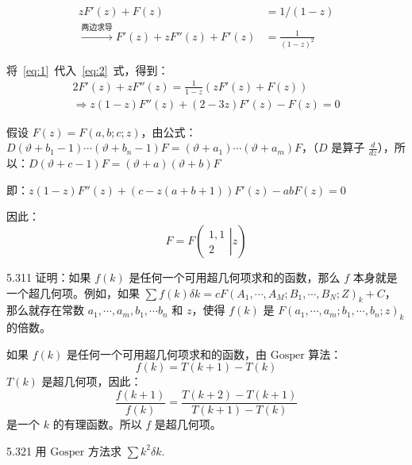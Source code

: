 \begin{align}
  zF'(z) + F(z) &= 1 / (1-z) \tag{1} \label{eq:1} \\
  \xrightarrow{\text{两边求导}} F'(z) + z F''(z) + F'(z) &= \frac{1}{(1-z)^2} \tag{2} \label{eq:2}
\end{align}

将~\ref{eq:1}~代入~\ref{eq:2}~式，得到：
\begin{gather*}
  2 F'(z) + z F''(z) = \frac{1}{1-z} (zF'(z) + F(z)) \\
  \Rightarrow z(1-z) F''(z) + (2 - 3z) F'(z) - F(z) = 0
\end{gather*}

假设 \( F(z) = F(a,b;c;z) \)，由公式：\( D(\vartheta + b_1 - 1) \cdots (\vartheta + b_n -1) F = (\vartheta + a_1) \cdots (\vartheta + a_m) F \)，（\( D \) 是算子 \( \frac{d}{dz} \)），所以：\( D(\vartheta + c - 1) F = (\vartheta + a) (\vartheta + b) F \)

即：\( z(1-z) F''(z) + (c-z(a+b+1))F'(z) - abF(z) = 0 \)

因此：
\[
  F = F
  \left( \left.
    \begin{array}{cccc}
      1, 1 \\
      2
  \end{array} \right|{z} \right)
\]

\begin{problem}{5.31}{1}
  证明：如果 \( f(k) \) 是任何一个可用超几何项求和的函数，那么 \( f \) 本身就是一个超几何项。例如，如果 \( \sum f(k) \delta k = c F(A_1, \cdots , A_M; B_1, \cdots , B_N; Z)_k + C \)，那么就存在常数 \( a_1, \cdots, a_m, b_1, \cdots b_n \) 和 \( z \)，使得 \( f(k) \) 是 \( F(a_1,\cdots,a_m;b_1,\cdots,b_n;z)_k \) 的倍数。
\end{problem}

如果 \( f(k) \) 是任何一个可用超几何项求和的函数，由 \( \text{Gosper} \) 算法：
\[
  f(k) = T(k+1) - T(k)
\]
\( T(k) \) 是超几何项，因此：
\[
  \frac{f(k+1)}{f(k)} = \frac{T(k+2)- T(k+1)}{T(k+1) - T(k)}
\]
是一个 \( k \) 的有理函数。所以 \( f \) 是超几何项。

\begin{problem}{5.32}{1}
  用 \( \text{Gosper} \) 方法求 \( \sum k^2 \delta k \).
\end{problem}

